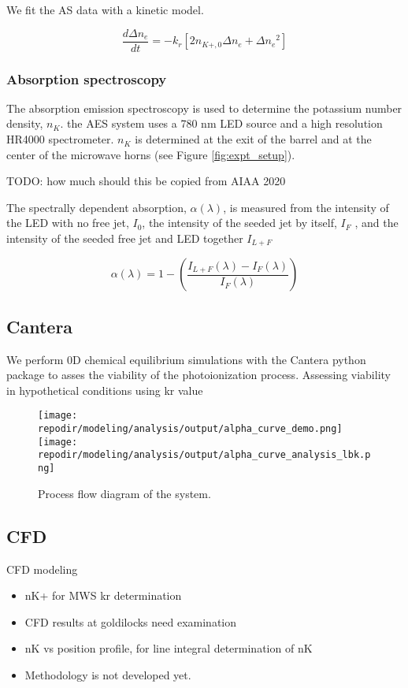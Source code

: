 We fit the AS data with a kinetic model. 

\begin{equation}
    \frac{d\Delta n_e}{dt} = - k_r [2 n_{K+,0}\Delta n_e + \Delta{n_e}^2]
\end{equation}

\subsubsection{Absorption spectroscopy}

The absorption emission spectroscopy is used to determine the potassium number density, $n_K$. the AES system uses a 780 nm LED source and a high resolution HR4000 spectrometer. $n_K$ is determined at the exit of the barrel and at the center of the microwave horns (see Figure \ref{fig:expt_setup}).

TODO: how much should this be copied from AIAA 2020

The spectrally dependent absorption, $\alpha(\lambda)$, is measured from the intensity of the LED with no free jet, $I_0$, the intensity
of the seeded jet by itself, $I_F$ , and the intensity of the seeded free jet and LED together $I_{L+F}$


\begin{equation}
    \alpha(\lambda) = 1 - \left(\frac{I_{L+F}(\lambda) - I_{F}(\lambda)}{I_F(\lambda)}\right)
\end{equation}




\subsection{Cantera}

We perform 0D chemical equilibrium simulations with the Cantera python package to asses the viability of the photoionization process. 
Assessing viability in hypothetical conditions using kr value

\begin{figure}[h]
    \texttt{[image: \\repodir/modeling/analysis/output/alpha\_curve\_demo.png]} 
    \texttt{[image: \\repodir/modeling/analysis/output/alpha\_curve\_analysis\_lbk.png]} 
    \caption{Process flow diagram of the system.}
\end{figure}

\subsection{CFD}

CFD modeling 

\begin{itemize}
\item nK+ for MWS kr determination
\item CFD results at goldilocks need examination
\item nK vs position profile, for line integral determination of nK
\item Methodology is not developed yet. 
\end{itemize}
